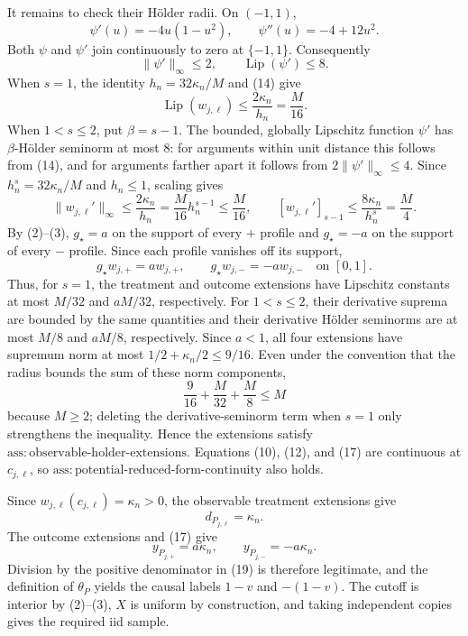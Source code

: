 It remains to check their H\"older radii.  On \((-1,1)\),
\[
\psi'(u)=-4u(1-u^2),
\qquad
\psi''(u)=-4+12u^2.
\tag{13}
\]
Both \(\psi\) and \(\psi'\) join continuously to zero at \(\{-1,1\}\).  Consequently
\[
\lVert\psi'\rVert_\infty\le2,
\qquad
\operatorname{Lip}(\psi')\le8.
\tag{14}
\]
When \(s=1\), the identity \(h_n=32\kappa_n/M\) and (14) give
\[
\operatorname{Lip}(w_{j,\ell})
\le\frac{2\kappa_n}{h_n}=\frac{M}{16}.
\tag{15}
\]
When \(1<s\le2\), put \(\beta=s-1\).  The bounded, globally Lipschitz function \(\psi'\) has \(\beta\)-H\"older seminorm at most \(8\): for arguments within unit distance this follows from (14), and for arguments farther apart it follows from \(2\lVert\psi'\rVert_\infty\le4\).  Since \(h_n^s=32\kappa_n/M\) and \(h_n\le1\), scaling gives
\[
\lVert w_{j,\ell}'\rVert_\infty
\le\frac{2\kappa_n}{h_n}
=\frac{M}{16}h_n^{s-1}\le\frac{M}{16},
\qquad
[w_{j,\ell}']_{s-1}
\le\frac{8\kappa_n}{h_n^s}=\frac{M}{4}.
\tag{16}
\]
By (2)--(3), \(g_\star=a\) on the support of every \(+\) profile and \(g_\star=-a\) on the support of every \(-\) profile.  Since each profile vanishes off its support,
\[
g_\star w_{j,+}=a w_{j,+},
\qquad
g_\star w_{j,-}=-a w_{j,-}
\quad\text{on }[0,1].
\tag{17}
\]
Thus, for \(s=1\), the treatment and outcome extensions have Lipschitz constants at most \(M/32\) and \(aM/32\), respectively.  For \(1<s\le2\), their derivative suprema are bounded by the same quantities and their derivative H\"older seminorms are at most \(M/8\) and \(aM/8\), respectively.  Since \(a<1\), all four extensions have supremum norm at most \(1/2+\kappa_n/2\le9/16\).  Even under the convention that the radius bounds the sum of these norm components,
\[
\frac9{16}+\frac{M}{32}+\frac{M}{8}\le M
\tag{18}
\]
because \(M\ge2\); deleting the derivative-seminorm term when \(s=1\) only strengthens the inequality.  Hence the extensions satisfy \(\mathrm{ass:observable\mbox{-}holder\mbox{-}extensions}\).  Equations (10), (12), and (17) are continuous at \(c_{j,\ell}\), so \(\mathrm{ass:potential\mbox{-}reduced\mbox{-}form\mbox{-}continuity}\) also holds.

Since \(w_{j,\ell}(c_{j,\ell})=\kappa_n>0\), the observable treatment extensions give
\[
d_{P_{j,\ell}}=\kappa_n.
\tag{19}
\]
The outcome extensions and (17) give
\[
y_{P_{j,+}}=a\kappa_n,
\qquad
y_{P_{j,-}}=-a\kappa_n.
\tag{20}
\]
Division by the positive denominator in (19) is therefore legitimate, and the definition of \(\theta_P\) yields the causal labels \(1-v\) and \(-(1-v)\).  The cutoff is interior by (2)--(3), \(X\) is uniform by construction, and taking independent copies gives the required iid sample.


